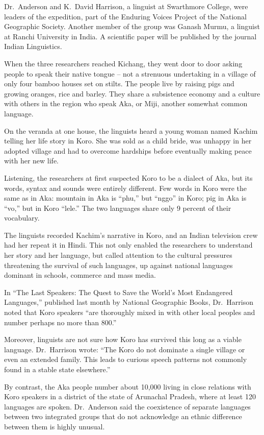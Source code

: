 ﻿\documentclass[12pt]{article}
\begin{document}
Dr.~Anderson and K.~David Harrison, a linguist at Swarthmore College, were leaders of the
expedition, part of the Enduring Voices Project of the National Geographic Society. Another member
of the group was Ganash Murmu, a linguist at Ranchi University in India. A scientific paper will be
published by the journal Indian Linguistics.

When the three researchers reached Kichang, they went door to door asking people to speak their
native tongue -- not a strenuous undertaking in a village of only four bamboo houses set on stilts.
The people live by raising pigs and growing oranges, rice and barley. They share a subsistence
economy and a culture with others in the region who speak Aka, or Miji, another somewhat common
language.

On the veranda at one house, the linguists heard a young woman named Kachim telling her life story
in Koro. She was sold as a child bride, was unhappy in her adopted village and had to overcome
hardships before eventually making peace with her new life.

Listening, the researchers at first suspected Koro to be a dialect of Aka, but its words, syntax and
sounds were entirely different. Few words in Koro were the same as in Aka: mountain in Aka is
``phu,'' but ``nggo'' in Koro; pig in Aka is ``vo,'' but in Koro ``lele.'' The two languages share
only 9 percent of their vocabulary.

The linguists recorded Kachim's narrative in Koro, and an Indian television crew had her repeat it
in Hindi. This not only enabled the researchers to understand her story and her language, but called
attention to the cultural pressures threatening the survival of such languages, up against national
languages dominant in schools, commerce and mass media.

In ``The Last Speakers: The Quest to Save the World's Most Endangered Languages,'' published last
month by National Geographic Books, Dr.~Harrison noted that Koro speakers ``are thoroughly mixed in
with other local peoples and number perhaps no more than 800.''

Moreover, linguists are not sure how Koro has survived this long as a viable language. Dr.~Harrison
wrote: ``The Koro do not dominate a single village or even an extended family. This leads to curious
speech patterns not commonly found in a stable state elsewhere.''

By contrast, the Aka people number about 10,000 living in close relations with Koro speakers in a
district of the state of Arunachal Pradesh, where at least 120 languages are spoken. Dr.~Anderson
said the coexistence of separate languages between two integrated groups that do not acknowledge an
ethnic difference between them is highly unusual.
\end{document}
